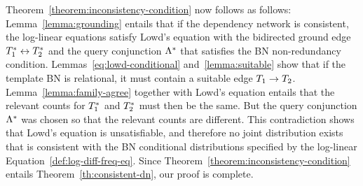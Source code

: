 \documentclass[runningheads,a4paper]{llncs}
\begin{document}
Theorem~\ref{theorem:inconsistency-condition} now follows as follows: Lemma~\ref{lemma:grounding} entails that if the dependency network is consistent, the log-linear equations satisfy Lowd's equation with the bidirected ground edge $T_{1}^{*}\hspace{0.0ex} \leftrightarrow T_{2}^{*}\hspace{0.0ex}$ and the query conjunction $\Lambda^{*}\hspace{0.0ex}$ that satisfies the BN non-redundancy condition. Lemmas~\ref{eq:lowd-conditional} and~\ref{lemma:suitable} show that if the template BN is relational, it must contain a suitable edge $T_{1} \rightarrow T_{2}$. Lemma~\ref{lemma:family-agree} 
 together with Lowd's equation entails that the relevant counts for $T_{1}^{*}\hspace{0.0ex}$ and $T_{2}^{*}\hspace{0.0ex}$ must then be the same. But the query conjunction $\Lambda^{*}\hspace{0.0ex}$ was chosen so that the relevant counts are different. This contradiction shows that Lowd's equation is unsatisfiable, and therefore no joint distribution exists that is consistent with the BN conditional distributions specified by the log-linear Equation~\ref{def:log-diff-freq-eq}. Since Theorem~\ref{theorem:inconsistency-condition} entails Theorem~\ref{th:consistent-dn}, our proof is complete.


%

\end{document}
